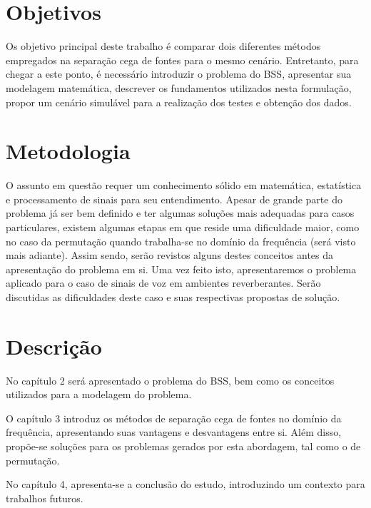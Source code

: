 \section{Objetivos}

Os objetivo principal deste trabalho é comparar dois diferentes métodos empregados na separação cega de fontes para o mesmo cenário. Entretanto, para chegar a este ponto, é necessário introduzir o problema do BSS, apresentar sua modelagem matemática, descrever os fundamentos utilizados nesta formulação, propor um cenário simulável para a realização dos testes e obtenção dos dados.


\section{Metodologia}

O assunto em questão requer um conhecimento sólido em matemática, estatística e processamento de sinais para seu entendimento. Apesar de grande parte do problema já ser bem definido e ter algumas soluções mais adequadas para casos particulares, existem algumas etapas em que reside uma dificuldade maior, como no caso da permutação quando trabalha-se no domínio da frequência (será visto mais adiante). Assim sendo, serão revistos alguns destes conceitos antes da apresentação do problema em si. Uma vez feito isto, apresentaremos o problema aplicado para o caso de sinais de voz em ambientes reverberantes. Serão discutidas as dificuldades deste caso e suas respectivas propostas de solução.


\section{Descrição}

No capítulo 2 será apresentado o problema do BSS, bem como os conceitos utilizados para a modelagem do problema.

O capítulo 3 introduz os métodos de separação cega de fontes no domínio da frequência, apresentando suas vantagens e desvantagens entre si. Além disso, propõe-se soluções para os problemas gerados por esta abordagem, tal como o de permutação.

No capítulo 4, apresenta-se a conclusão do estudo, introduzindo um contexto para trabalhos futuros.


